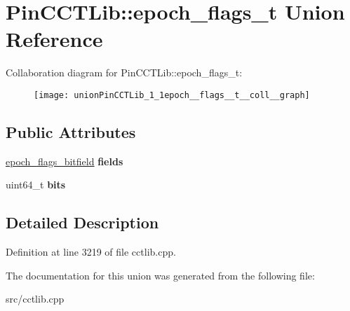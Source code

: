 \hypertarget{unionPinCCTLib_1_1epoch__flags__t}{\section{Pin\-C\-C\-T\-Lib\-:\-:epoch\-\_\-flags\-\_\-t Union Reference}
\label{unionPinCCTLib_1_1epoch__flags__t}
}


Collaboration diagram for Pin\-C\-C\-T\-Lib\-:\-:epoch\-\_\-flags\-\_\-t\-:
\nopagebreak
\begin{figure}[H]
\begin{center}
\leavevmode
\texttt{[image: unionPinCCTLib\_1\_1epoch\_\_flags\_\_t\_\_coll\_\_graph]}
\end{center}
\end{figure}
\subsection*{Public Attributes}
\begin{DoxyCompactItemize}
\item 
\hypertarget{unionPinCCTLib_1_1epoch__flags__t_aa6f14e744b98403a0fdb444c2fb2b6d1}{\hyperlink{structPinCCTLib_1_1epoch__flags__bitfield}{epoch\-\_\-flags\-\_\-bitfield} {\bfseries fields}}\label{unionPinCCTLib_1_1epoch__flags__t_aa6f14e744b98403a0fdb444c2fb2b6d1}

\item 
\hypertarget{unionPinCCTLib_1_1epoch__flags__t_afbc7d2d89f89835387d90fd8a0aa78d2}{uint64\-\_\-t {\bfseries bits}}\label{unionPinCCTLib_1_1epoch__flags__t_afbc7d2d89f89835387d90fd8a0aa78d2}

\end{DoxyCompactItemize}


\subsection{Detailed Description}


Definition at line 3219 of file cctlib.\-cpp.



The documentation for this union was generated from the following file\-:\begin{DoxyCompactItemize}
\item 
src/cctlib.\-cpp\end{DoxyCompactItemize}
